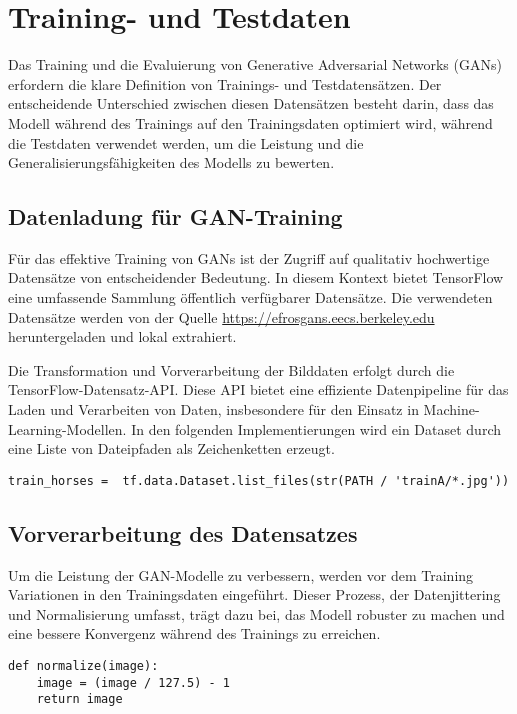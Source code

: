 \section{Training- und Testdaten}
Das Training und die Evaluierung von Generative Adversarial Networks (GANs) erfordern die klare Definition von Trainings- und Testdatensätzen. Der entscheidende Unterschied zwischen diesen Datensätzen besteht darin, dass das Modell während des Trainings auf den Trainingsdaten optimiert wird, während die Testdaten verwendet werden, um die Leistung und die Generalisierungsfähigkeiten des Modells zu bewerten.

\subsection{Datenladung für GAN-Training}
Für das effektive Training von GANs ist der Zugriff auf qualitativ hochwertige Datensätze von entscheidender Bedeutung. In diesem Kontext bietet TensorFlow eine umfassende Sammlung öffentlich verfügbarer Datensätze. Die verwendeten Datensätze werden von der Quelle \url{https://efrosgans.eecs.berkeley.edu} heruntergeladen und lokal extrahiert.



Die Transformation und Vorverarbeitung der Bilddaten erfolgt durch die TensorFlow-Datensatz-API. Diese API bietet eine effiziente Datenpipeline für das Laden und Verarbeiten von Daten, insbesondere für den Einsatz in Machine-Learning-Modellen. In den folgenden Implementierungen wird ein Dataset durch eine Liste von Dateipfaden als Zeichenketten erzeugt.

\begin{lstlisting}[language=pyhaff, caption={Erzeugung eines Tensorflow-Dataset aus CycleGAN Implementierung}, label={cod:createDataset}]
train_horses =  tf.data.Dataset.list_files(str(PATH / 'trainA/*.jpg')) 
\end{lstlisting}

\subsection{Vorverarbeitung des Datensatzes}
Um die Leistung der GAN-Modelle zu verbessern, werden vor dem Training Variationen in den Trainingsdaten eingeführt. Dieser Prozess, der Datenjittering und Normalisierung umfasst, trägt dazu bei, das Modell robuster zu machen und eine bessere Konvergenz während des Trainings zu erreichen.
\newpage
\begin{lstlisting}[language=pyhaff, caption={Vorverarbeitung des Datensatzes: Normalisierung}, label={cod:normalizing}]
def normalize(image):
    image = (image / 127.5) - 1
    return image
\end{lstlisting}

